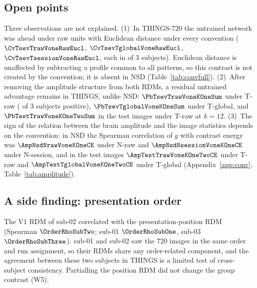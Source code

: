 \subsection{Open points}
\label{sec:openres}
Three observations are not explained. (1)~In THINGS-720 the untrained network was ahead under raw units
with Euclidean distance under every convention ($\CvTsevTrawVoneRawEucl$, $\CvTsevTglobalVoneRawEucl$,
$\CvTsevTsessionVoneRawEucl$, each in \CvTsevTglobalVoneRawEuclPos{} of 3 subjects). Euclidean distance is
unaffected by subtracting a profile common to all patterns, so this contrast is not created by the
convention; it is absent in NSD (Table~\ref{tab:convfull}). (2)~After removing the amplitude structure
from both RDMs, a residual untrained advantage remains in THINGS, unlike NSD: $\PbTsevTrawVoneKOneSum$
under T-raw (\PbTsevTrawVoneKOneSumPos{} of 3 subjects positive), $\PbTsevTglobalVoneKOneSum$ under
T-global, and $\PbTestTrawVoneKOneTwoSum$ in the test images under T-raw at $k = 12$. (3)~The sign of the
relation between the brain amplitude and the image statistics depends on the convention: in NSD the
Spearman correlation of $g$ with contrast energy was $\AmpNsdNrawVoneKOneCE$ under N-raw and
$\AmpNsdNsessionVoneKOneCE$ under N-session, and in the test images $\AmpTestTrawVoneKOneTwoCE$ under T-raw
and $\AmpTestTglobalVoneKOneTwoCE$ under T-global (Appendix~\ref{app:conv}, Table~\ref{tab:amplitude}).

\subsection{A side finding: presentation order}
\label{sec:sidefinding}
The V1 RDM of sub-02 correlated with the presentation-position RDM (Spearman $\OrderRhoSubTwo$; sub-01
$\OrderRhoSubOne$, sub-03 $\OrderRhoSubThree$). sub-01 and sub-02 saw the 720 images in the same order and
run assignment, so their RDMs share any order-related component, and the agreement between these two
subjects in THINGS is a limited test of cross-subject consistency. Partialling the position RDM did not
change the group contrast (W5).
